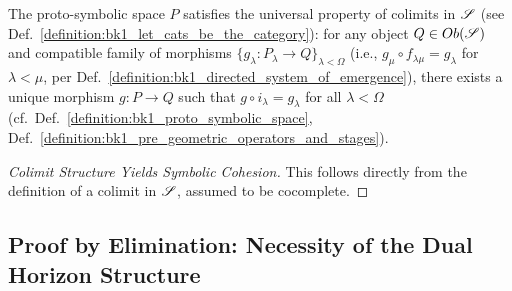 \begin{lemma}
\label{lemma:bk1_universality_of_proto_symbolic_space}
The proto-symbolic space $P$ satisfies the universal property of colimits in $\mathscr{S}$ (see Def.~\ref{definition:bk1_let_cats_be_the_category}): for any object $Q \in Ob(\mathscr{S})$ and compatible family of morphisms $\{g_\lambda: P_\lambda \to Q\}_{\lambda < \Omega}$ (i.e., $g_\mu \circ f_{\lambda\mu} = g_\lambda$ for $\lambda < \mu$, per Def.~\ref{definition:bk1_directed_system_of_emergence}), there exists a unique morphism $g: P \to Q$ such that $g \circ i_\lambda = g_\lambda$ for all $\lambda < \Omega$ (cf.~Def.~\ref{definition:bk1_proto_symbolic_space}, Def.~\ref{definition:bk1_pre_geometric_operators_and_stages}).
\begin{proof}[Colimit Structure Yields Symbolic Cohesion]
\label{proof:bk1_colimit_yields_categoric_structure}
This follows directly from the definition of a colimit in $\mathscr{S}$, assumed to be cocomplete.
\end{proof}
\end{lemma}
\subsection{Proof by Elimination: Necessity of the Dual Horizon Structure}
\label{subsec:bk1_necessity_of_the_dual_horizon_structure}

